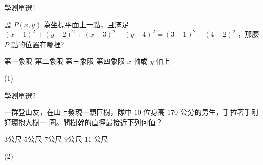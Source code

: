     \begin{QUESTION}
        \begin{ExamInfo}{91}{學測}{單選}{1}
        \end{ExamInfo}
        \begin{ExamAnsRateInfo}{76}{97}{83}{48}
        \end{ExamAnsRateInfo}
        \begin{QBODY}
            設 $P(x,y)$ 為坐標平面上一點，且滿足
            $(x-1)^2 +(y-2)^2 + (x-3)^2 +(y-4)^2 = (3-1)^2 +(4-2)^2$
            ，那麼 $P$ 點的位置在哪裡?
            
            \begin{QOPS} 
                \QOP 第一象限 
                \QOP 第二象限 
                \QOP 第三象限 
                \QOP 第四象限 
                \QOP $x$ 軸或 $y$ 軸上
            \end{QOPS}
        \end{QBODY}
        \begin{QFROMS}
        \end{QFROMS}
        \begin{QTAGS}\end{QTAGS}
        \begin{QANS}
            (1)
        \end{QANS}
        \begin{QSOLLIST}
        \end{QSOLLIST}
        \begin{QEMPTYSPACE}
        \end{QEMPTYSPACE}
    \end{QUESTION}
    \begin{QUESTION}
        \begin{ExamInfo}{91}{學測}{單選}{2}
        \end{ExamInfo}
        \begin{ExamAnsRateInfo}{51}{79}{51}{23}
        \end{ExamAnsRateInfo}
        \begin{QBODY}
            一群登山友，在山上發現一顆巨樹，隊中 $10$ 位身高 $170$ 公分的男生，手拉著手剛好環抱大樹一 圈。問樹幹的直徑最接近下列何值？ 
            \begin{QOPS} 
                \QOP $3$公尺 
                \QOP $5$公尺
                \QOP $7$公尺 
                \QOP $9$公尺 
                \QOP $11$ 公尺
            \end{QOPS}
        \end{QBODY}
        \begin{QFROMS}
        \end{QFROMS}
        \begin{QTAGS}\end{QTAGS}
        \begin{QANS}
            (2)
        \end{QANS}
        \begin{QSOLLIST}
        \end{QSOLLIST}
        \begin{QEMPTYSPACE}
        \end{QEMPTYSPACE}
    \end{QUESTION}
